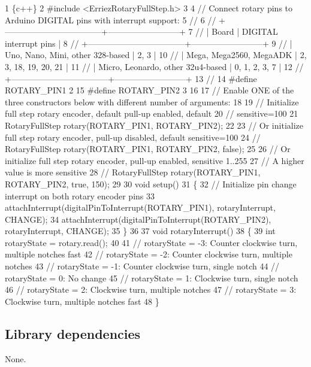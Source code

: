 \begin{DoxyCode}
1 \{c++\}
2 #include <ErriezRotaryFullStep.h>
3 
4 // Connect rotary pins to Arduino DIGITAL pins with interrupt support:
5 //
6 // +-----------------------------------+--------------------------+
7 // |              Board                |  DIGITAL interrupt pins  |
8 // +-----------------------------------+--------------------------+
9 // | Uno, Nano, Mini, other 328-based  |  2, 3                    |
10 // | Mega, Mega2560, MegaADK           |  2, 3, 18, 19, 20, 21    |
11 // | Micro, Leonardo, other 32u4-based |  0, 1, 2, 3, 7           |
12 // +-----------------------------------+--------------------------+
13 //
14 #define ROTARY\_PIN1   2
15 #define ROTARY\_PIN2   3
16 
17 // Enable ONE of the three constructors below with different number of arguments:
18 
19 // Initialize full step rotary encoder, default pull-up enabled, default 
20 // sensitive=100
21 RotaryFullStep rotary(ROTARY\_PIN1, ROTARY\_PIN2);
22 
23 // Or initialize full step rotary encoder, pull-up disabled, default sensitive=100
24 // RotaryFullStep rotary(ROTARY\_PIN1, ROTARY\_PIN2, false);
25 
26 // Or initialize full step rotary encoder, pull-up enabled, sensitive 1..255
27 // A higher value is more sensitive
28 // RotaryFullStep rotary(ROTARY\_PIN1, ROTARY\_PIN2, true, 150);
29 
30 void setup()
31 \{
32   // Initialize pin change interrupt on both rotary encoder pins
33   attachInterrupt(digitalPinToInterrupt(ROTARY\_PIN1), rotaryInterrupt, CHANGE);
34   attachInterrupt(digitalPinToInterrupt(ROTARY\_PIN2), rotaryInterrupt, CHANGE);
35 \}
36 
37 void rotaryInterrupt()
38 \{
39   int rotaryState = rotary.read();
40 
41   // rotaryState = -3: Counter clockwise turn, multiple notches fast
42   // rotaryState = -2: Counter clockwise turn, multiple notches
43   // rotaryState = -1: Counter clockwise turn, single notch
44   // rotaryState = 0:  No change
45   // rotaryState = 1:  Clockwise turn, single notch
46   // rotaryState = 2:  Clockwise turn, multiple notches
47   // rotaryState = 3:  Clockwise turn, multiple notches fast
48 \}
\end{DoxyCode}


\subsection*{Library dependencies}


\begin{DoxyItemize}
\item None.
\end{DoxyItemize}

